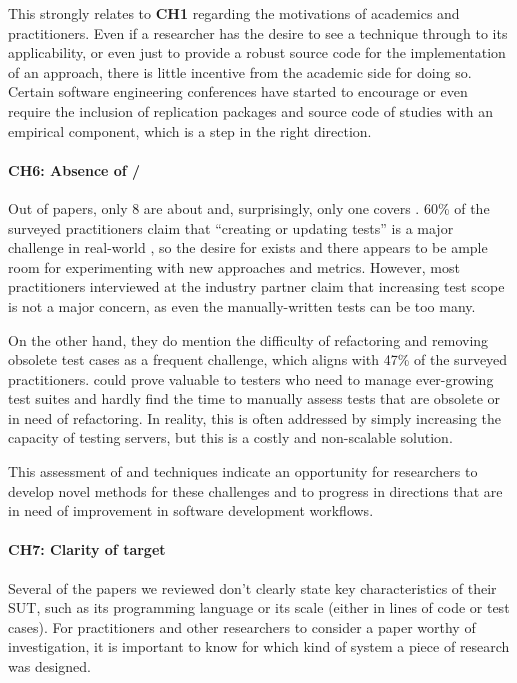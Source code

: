 This strongly relates to \textbf{CH1} regarding the motivations of academics and practitioners.
Even if a researcher has the desire to see a technique through to its applicability, or even just to provide a robust source code for the implementation of an approach, there is little incentive from the academic side for doing so.
Certain software engineering conferences have started to encourage or even require the inclusion of replication packages and source code of studies with an empirical component, which is a step in the right direction.


\paragraph{CH6: Absence of \tsr/\tsa}
Out of \numpapers papers, only 8 are about \tsr and, surprisingly, only one covers \tsa 
 .
60\% of the surveyed practitioners claim that ``creating or updating tests'' is a major challenge in real-world \rt, so the desire for \tsa exists and there appears to be ample room for experimenting with new approaches and metrics.
However, most practitioners interviewed at the industry partner claim that increasing test scope is not a major concern, as even the manually-written tests can be too many.

On the other hand, they do mention the difficulty of refactoring and removing obsolete test cases as a frequent challenge, which aligns with 47\% of the surveyed practitioners.
\tsr could prove valuable to testers who need to manage ever-growing test suites and hardly find the time to manually assess tests that are obsolete or in need of refactoring.
In reality, this is often addressed by simply increasing the capacity of testing servers, but this is a costly and non-scalable solution.

This assessment of \tsr and \tsa techniques indicate an opportunity for researchers to develop novel methods for these challenges and to progress in directions that are in need of improvement in software development workflows.

\paragraph{CH7: Clarity of target}
Several of the papers we reviewed don't clearly state key characteristics of their SUT, such as its programming language or its scale (either in lines of code or test cases).
For practitioners and other researchers to consider a paper worthy of investigation, it is important to know for which kind of system a piece of research was designed.

